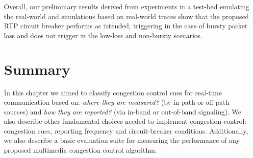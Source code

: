 Overall, our preliminary results derived from experiments in a test-bed
emulating the real-world and simulations based on real-world traces show that
the proposed RTP circuit breaker performs as intended, triggering in the case
of bursty  packet loss and does not trigger in the low-loss and non-bursty
scenarios. 


\section{Summary}

In this chapter we aimed to classify congestion control cues for real-time
communication based on: \emph{where they are measured?} (by in-path or 
off-path sources) and \emph{how they are reported?} (via in-band or out-of-band
signaling). We also describe other fundamental choices needed to implement 
congestion control: congestion cues, reporting frequency and 
circuit-breaker conditions. Additionally, we also describe a basic evaluation
suite for measuring the performance of any proposed multimedia congestion control
algorithm.

